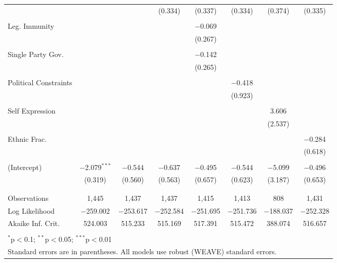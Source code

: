\documentclass[a4paper]{article}\usepackage[]{graphicx}\usepackage[]{color}
\begin{document}
\begin{table}
\begin{center}
{\begin{tabular}{@{\extracolsep{5pt}}lccccccc}
  &  &  & (0.334) & (0.337) & (0.334) & (0.374) & (0.335) \\ 
  & & & & & & & \\ 
 Leg. Immunity &  &  &  & $-$0.069 &  &  &  \\ 
  &  &  &  & (0.267) &  &  &  \\ 
  & & & & & & & \\ 
 Single Party Gov. &  &  &  & $-$0.142 &  &  &  \\ 
  &  &  &  & (0.265) &  &  &  \\ 
  & & & & & & & \\ 
 Political Constraints &  &  &  &  & $-$0.418 &  &  \\ 
  &  &  &  &  & (0.923) &  &  \\ 
  & & & & & & & \\ 
 Self Expression &  &  &  &  &  & 3.606 &  \\ 
  &  &  &  &  &  & (2.537) &  \\ 
  & & & & & & & \\ 
 Ethnic Frac. &  &  &  &  &  &  & $-$0.284 \\ 
  &  &  &  &  &  &  & (0.618) \\ 
  & & & & & & & \\ 
 (Intercept) & $-$2.079$^{***}$ & $-$0.544 & $-$0.637 & $-$0.495 & $-$0.544 & $-$5.099 & $-$0.496 \\ 
  & (0.319) & (0.560) & (0.563) & (0.657) & (0.623) & (3.187) & (0.653) \\ 
  & & & & & & & \\ 
\hline \\[-1.8ex] 
Observations & 1,445 & 1,437 & 1,437 & 1,415 & 1,413 & 808 & 1,431 \\ 
Log Likelihood & $-$259.002 & $-$253.617 & $-$252.584 & $-$251.695 & $-$251.736 & $-$188.037 & $-$252.328 \\ 
Akaike Inf. Crit. & 524.003 & 515.233 & 515.169 & 517.391 & 515.472 & 388.074 & 516.657 \\ 
\hline 
\hline \\[-1.8ex] 
\multicolumn{8}{l}{$^{*}$p$<$0.1; $^{**}$p$<$0.05; $^{***}$p$<$0.01} \\ 
\multicolumn{8}{l}{Standard errors are in parentheses. All models use robust (WEAVE) standard errors.} \\ 
\end{tabular} 

}
\end{center}
\end{table}
\end{document}
